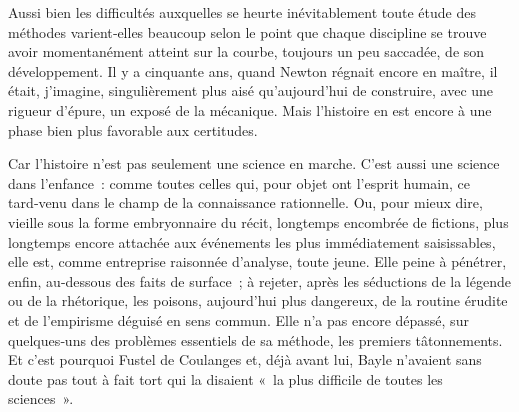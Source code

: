 \documentclass[french,twoside]{book} %
\newcommand{\astermono}{\medskip\centerline{\color{rubric}\large\selectfont{\syms ✻}}\medskip\par}%
\begin{document}
Aussi bien les difficultés auxquelles se heurte inévitablement toute étude des méthodes varient‑elles beaucoup selon le point que chaque discipline se trouve avoir momentanément atteint sur la courbe, toujours un peu saccadée, de son développement. Il y a cinquante ans, quand Newton régnait encore en maître, il était, j’imagine, singulièrement plus aisé qu’aujourd’hui de construire, avec une rigueur d’épure, un exposé de la mécanique. Mais l’histoire en est encore à une phase bien plus favo­rable aux certitudes.\par
Car l’histoire n’est pas seulement une science en marche. C’est aussi une science dans l’enfance : comme toutes celles qui, pour objet ont l’esprit humain, ce tard‑venu dans le champ de la connaissance ration­nelle. Ou, pour mieux dire, vieille sous la forme embryonnaire du récit, longtemps encombrée de fictions, plus longtemps encore attachée aux événements les plus immédiatement saisissables, elle est, comme entre­prise raisonnée d’analyse, toute jeune. Elle peine à pénétrer, enfin, au-­dessous des faits de surface ; à rejeter, après les séductions de la légende ou de la rhétorique, les poisons, aujourd’hui plus dangereux, de la routine érudite et de l’empirisme déguisé en sens commun. Elle n’a pas encore dépassé, sur quelques‑uns des problèmes essentiels de sa méthode, les premiers tâtonnements. Et c’est pourquoi Fustel de Coulanges et, déjà avant lui, Bayle n’avaient sans doute pas tout à fait tort qui la disaient « la plus difficile de toutes les sciences ».\par

\astermono
\end{document}
